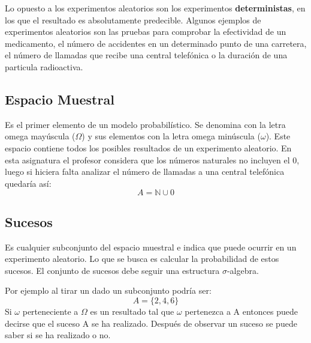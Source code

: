 \documentclass[11pt]{article}
\theoremstyle{plain}
\begin{document}
            Lo opuesto a los experimentos aleatorios son los experimentos \textbf{deterministas}, en los que el resultado es absolutamente predecible. Algunos ejemplos de experimentos aleatorios son las pruebas para comprobar la efectividad de un medicamento, el número de accidentes en un determinado punto de una carretera, el número de llamadas que recibe una central telefónica o la duración de una particula radioactiva.
        \subsection{Espacio Muestral} %
        \label{sub:espacio_muestral}
            Es el primer elemento de un modelo probabilístico. Se denomina con la letra omega mayúscula ($\varOmega$) y sus elementos con la letra omega minúscula ($\omega$). Este espacio contiene todos los posibles resultados de un experimento aleatorio. En esta asignatura el profesor considera que los números naturales no incluyen el 0, luego si hiciera falta analizar el número de llamadas a una central telefónica quedaría así:
            \begin{equation}
                A = \mathbb{N} \cup 0
            \end{equation}

        \subsection{Sucesos} %
        \label{sub:sucesos}
            Es cualquier subconjunto del espacio muestral e indica que puede ocurrir en un experimento aleatorio. Lo que se busca es calcular la probabilidad de estos sucesos. El conjunto de sucesos debe seguir una estructura $\sigma$-algebra.

            Por ejemplo al tirar un dado un subconjunto podría ser:
            \begin{equation}
                A = \{2,4,6\}
            \end{equation}
            Si $\omega$ perteneciente a $\varOmega$ es un resultado tal que $\omega$ pertenezca a A entonces puede decirse que el suceso A se ha realizado. Después de observar un suceso se puede saber si se ha realizado o no.

\end{document}
